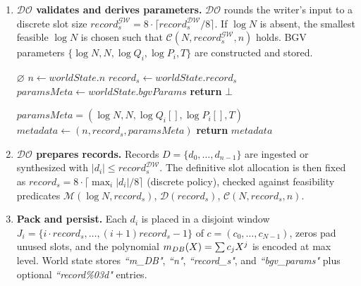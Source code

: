 \documentclass[letterpaper,journal]{IEEEtran}
\newcommand{\encP}[1]{\emph{enc}^{\mathrm{poly}}\!\left(#1\right)}
\begin{document}
\begin{enumerate}
\begin{algorithm}[!htbp]
\begin{algorithmic}[1]
      \STATE $\emph{$m_{DB}$}(X) \gets \encP{c} \in \mathbb{Z}_T[X]/(X^N+1)$
      \STATE $worldState \gets \{\emph{$m_{DB}$},\;n,\;record_s,\;bgvParams,\;op:D\}$
      \STATE \textbf{return} \textsc{ok}
      \end{algorithmic}
    \end{algorithm}

    \item \textbf{$\mathcal{DO}$ validates and derives parameters.}  
    $\mathcal{DO}$ rounds the writer’s input to a discrete slot size 
    $record_{s}^{\mathcal{GW}} = 8 \cdot \lceil record_{s}^{\mathcal{DW}} / 8 \rceil$. 
    If $\log N$ is absent, the smallest feasible $\log N$ is chosen such that 
    $\mathcal{C}(N,record_{s}^{\mathcal{GW}},n)$ holds. 
    BGV parameters $\{\log N,N,\log Q_i,\log P_i,T\}$ are constructed and stored.

    \begin{algorithm}[!htbp]
      \caption{\texttt{GetMetadata} (chaincode)}
      \label{alg:getmetadata}
      \begin{algorithmic}[1]
      \REQUIRE $\varnothing$
      \STATE $n \gets worldState.n$
      \STATE $record_s \gets worldState.record_s$
      \STATE $paramsMeta \gets worldState.bgvParams$
      \STATE \textbf{return} $\bot$
      \ENDIF
  
      \STATE $paramsMeta=(\log N, N, \log Q_i[], \log P_i[], T)$
      \STATE $metadata \gets (n, record_s, paramsMeta)$
      \STATE \textbf{return} $metadata$
      \end{algorithmic}
    \end{algorithm}

    \item \textbf{$\mathcal{DO}$ prepares records.}  
    Records $D=\{d_0,\dots,d_{n-1}\}$ are ingested or synthesized with $|d_i|\le record_{s}^{\mathcal{DW}}$. 
    The definitive slot allocation is then fixed as 
    $record_s = 8 \cdot \lceil \max_i |d_i| / 8 \rceil$ (discrete policy), 
    checked against feasibility predicates 
    $\mathcal{M}(\log N,record_s)$, $\mathcal{D}(record_s)$, $\mathcal{C}(N,record_s,n)$. 

    \item \textbf{Pack and persist.}  
    Each $d_i$ is placed in a disjoint window $J_i=\{i\cdot record_s,\dots,(i+1)record_s-1\}$ of $c=(c_0,\dots,c_{N-1})$, 
    zeros pad unused slots, and the polynomial $\emph{$m_{DB}$}(X)=\sum c_j X^j$ is encoded at max level. 
    World state stores \emph{``m\_DB"}, \emph{``n"}, \emph{``record\_s"}, and \emph{``bgv\_params"} 
    plus optional \emph{``record\%03d"} entries. 


\end{enumerate}
\end{document}
